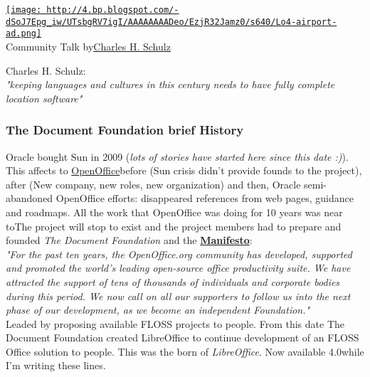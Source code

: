 
\begin{tabular}\href{http://4.bp.blogspot.com/-dSoJ7Epg_iw/UTsbgRV7igI/AAAAAAAADeo/EzjR32Jamz0/s1600/Lo4-airport-ad.png}{
\texttt{[image: http://4.bp.blogspot.com/-dSoJ7Epg\_iw/UTsbgRV7igI/AAAAAAAADeo/EzjR32Jamz0/s640/Lo4-airport-ad.png]}} \\ 
Community Talk by\nolinebreak\href{http://standardsandfreedom.net/}{Charles H. Schulz}
\end{tabular} Charles H. Schulz:
\\\textit{"keeping languages and cultures in this century needs to have fully complete location software"}

\subsubsection{ The Document Foundation brief History} Oracle bought Sun in 2009 (\textit{lots of stories have started here since this date :)}). This affects to \href{http://www.openoffice.org/}{OpenOffice}\nolinebreakdevelopment before (Sun crisis didn't provide founds to the project), after (New company, new roles, new organization) and then, Oracle semi-abandoned OpenOffice efforts: disappeared references from web pages, guidance and roadmaps. All the work that OpenOffice was doing for 10 years was near to\nolinebreakdisappear\nolinebreak The project will stop to exist and the project members had to prepare and founded \textit{The Document Foundation} and the \textbf{\href{http://www.documentfoundation.org/foundation}{Manifesto}}:\textit{
\\}\textit{"For the past ten years, the OpenOffice.org community has developed, supported and promoted the world's leading open-source office productivity suite. We have attracted the support of tens of thousands of individuals and corporate bodies during this period. We now call on all our supporters to follow us into the next phase of our development, as we become an independent Foundation."}
\\ Leaded by proposing available FLOSS projects to people. From this date The Document Foundation created LibreOffice to continue development of an FLOSS Office solution to people. This was the born of \textit{LibreOffice}. Now available 4.0\nolinebreakversion while I'm writing these lines.

